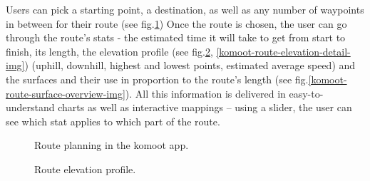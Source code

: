 Users can pick a starting point, a destination, as well as any number of waypoints in between for their route (see fig.\ref{komoot-nav-img})
Once the route is chosen, the user can go through the route's stats - the estimated time it will take to get from start to finish, its length, the elevation profile (see fig.\ref{komoot-route-details-img}, \ref{komoot-route-elevation-detail-img}) (uphill, downhill, highest and lowest points, estimated average speed) and the surfaces and their use in proportion to the route's length (see fig.\ref{komoot-route-surface-overview-img}).
All this information is delivered in easy-to-understand charts as well as interactive mappings -- using a slider, the user can see which stat applies to which part of the route.

\begin{figure}[h!]
    \centering
        \caption{Route planning in the komoot app. \cite{komoot-nav-img}}
        \label{komoot-nav-img}
\end{figure}

\begin{figure}[h!]
    \centering
        \caption{Route elevation profile. \cite{komoot-route-details-img}}
        \label{komoot-route-details-img}
\end{figure}

